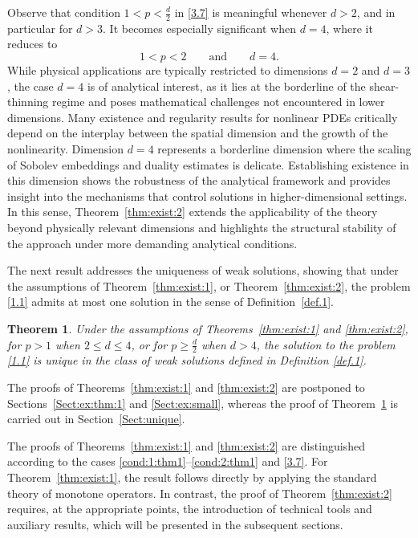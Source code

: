 \documentclass[12pt,reqno]{amsart}
\numberwithin{equation}{section}
\newtheorem{theorem}{Theorem}[section]
\theoremstyle{definition}
\begin{document}
{Observe that condition $1<p<\tfrac{d}{2}$ in \eqref{3.7} is meaningful whenever $d>2$, and in particular for $d>3$.
It becomes especially significant when $d=4$, where it reduces to
\begin{equation*}%
1 < p < 2 \qquad \mbox{and} \qquad d=4.
\end{equation*}
While physical applications are typically restricted to dimensions $d=2$ and $d=3$, the case $d=4$ is of analytical interest, as it lies at the borderline of the shear-thinning regime and poses mathematical challenges not encountered in lower dimensions.
}
Many existence and regularity results for nonlinear PDEs critically depend on the interplay between the spatial dimension and the growth of the nonlinearity.
Dimension $d=4$ represents a borderline dimension where the scaling of Sobolev embeddings and duality estimates is delicate.
Establishing existence in this dimension shows the robustness of the analytical framework and provides insight into the mechanisms that control solutions in higher-dimensional settings.
In this sense, Theorem~\ref{thm:exist:2} extends the applicability of the theory beyond physically relevant dimensions and highlights the structural stability of the approach under more demanding analytical conditions.





The next result addresses the uniqueness of weak solutions, showing that under the assumptions of Theorem~\ref{thm:exist:1}, or Theorem~\ref{thm:exist:2}, the problem \eqref{1.1} admits at most one solution in the sense of Definition~\ref{def.1}.

\begin{theorem}\label{UniT}
{	Under the assumptions of Theorems~\ref{thm:exist:1} and \ref{thm:exist:2}, for $p>1$ when $2\leq d\leq 4$, or for $p\geq \frac{d}{2}$ when $d>4$, the solution to the problem \eqref{1.1} is {unique in the class of weak solutions defined in Definition \ref{def.1}}.}
\end{theorem}

The proofs of Theorems~\ref{thm:exist:1} and \ref{thm:exist:2} are postponed to Sections~\ref{Sect:ex:thm:1} and \ref{Sect:ex:small}, whereas the proof of Theorem~\ref{UniT}  is carried out in Section~\ref{Sect:unique}.


\medskip
The proofs of Theorems~\ref{thm:exist:1} and \ref{thm:exist:2} are distinguished according to the cases \eqref{cond:1:thm1}--\eqref{cond:2:thm1} and \eqref{3.7}.
For Theorem~\ref{thm:exist:1}, the result follows directly by applying the standard theory of monotone operators.
In contrast, the proof of Theorem~\ref{thm:exist:2} requires, at the appropriate points, the introduction of technical tools and auxiliary results, which will be presented in the subsequent sections.
\end{document}
